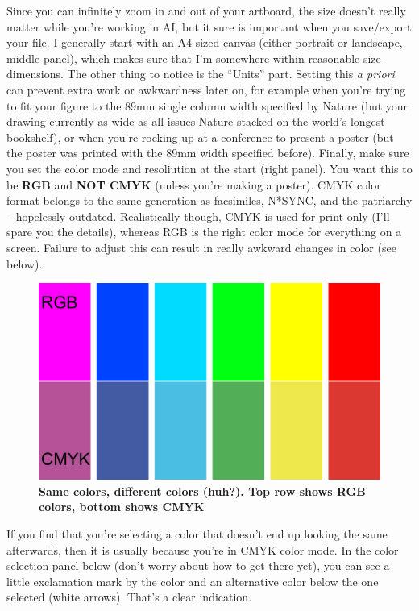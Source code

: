 \documentclass[]{article}
\begin{document}
Since you can infinitely zoom in and out of your artboard, the size
doesn't really matter while you're working in AI, but it sure is
important when you save/export your file. I generally start with an
A4-sized canvas (either portrait or landscape, middle panel), which
makes sure that I'm somewhere within reasonable size-dimensions. The
other thing to notice is the ``Units'' part. Setting this \emph{a
priori} can prevent extra work or awkwardness later on, for example when
you're trying to fit your figure to the 89mm single column width
specified by Nature (but your drawing currently as wide as all issues
Nature stacked on the world's longest bookshelf), or when you're rocking
up at a conference to present a poster (but the poster was printed with
the 89mm width specified before). Finally, make sure you set the color
mode and resoliution at the start (right panel). You want this to be
\textbf{RGB} and \textbf{NOT CMYK} (unless you're making a poster). CMYK
color format belongs to the same generation as facsimiles, N*SYNC, and
the patriarchy -- hopelessly outdated. Realistically though, CMYK is
used for print only (I'll spare you the details), whereas RGB is the
right color mode for everything on a screen. Failure to adjust this can
result in really awkward changes in color (see below).

\begin{figure}
\centering
\includegraphics{colorsRGBCMYK.png}
\caption{\textbf{Same colors, different colors (huh?). Top row shows RGB
colors, bottom shows CMYK}}
\end{figure}

If you find that you're selecting a color that doesn't end up looking
the same afterwards, then it is usually because you're in CMYK color
mode. In the color selection panel below (don't worry about how to get
there yet), you can see a little exclamation mark by the color and an
alternative color below the one selected (white arrows). That's a clear
indication.
\end{document}
